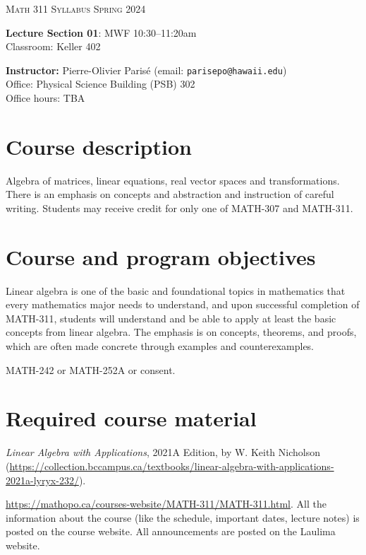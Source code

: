\documentclass[12pt]{amsart}
\newcommand{\spacer}{\vspace{.2cm}}
\newcommand{\svs}{\vspace{.1cm}}
\begin{document}
\thispagestyle{empty}

\begin{center}
\textsc{Math 311} \hfill {\Large\textsc{Syllabus}} \hfill \textsc{Spring 2024}
\end{center}

\noindent\hrulefill

\noindent \textbf{Lecture Section 01}: MWF 10:30--11:20am \\
Classroom: Keller 402

\spacer

\noindent\textbf{Instructor:} Pierre-Olivier Paris{\'e} (email: \texttt{parisepo@hawaii.edu})\\
Office: Physical Science Building (PSB) 302\\
Office hours: TBA

\noindent\hrulefill

\section*{Course description}
Algebra of matrices, linear equations, real vector spaces and transformations. There is an emphasis on concepts and abstraction and instruction of careful writing. Students may receive credit for only one of MATH-307 and MATH-311. \svs

\section*{Course and program objectives}
Linear algebra is one of the basic and foundational topics in mathematics that every mathematics major needs to understand, and upon successful completion of MATH-311, students will understand and be able to apply at least the basic concepts from linear algebra. The emphasis is on concepts, theorems, and proofs, which are often made concrete through examples and counterexamples.

MATH-242 or MATH-252A or consent.

\section*{Required course material}

 \emph{Linear Algebra with Applications}, 2021A Edition, by W. Keith Nicholson (\url{https://collection.bccampus.ca/textbooks/linear-algebra-with-applications-2021a-lyryx-232/}). 

 \url{https://mathopo.ca/courses-website/MATH-311/MATH-311.html}. All the information about the course (like the schedule, important dates, lecture notes) is posted on the course website. All announcements are posted on the Laulima website.
\end{document}
